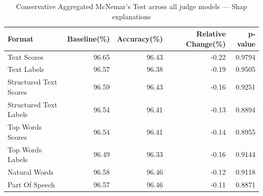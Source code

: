 \begin{table}[htbp]
\centering
\small
\caption{Conservative Aggregated McNemar's Test across all judge models --- Shap explanations}
\label{tab:conservative-aggregated-shap-all-models}
\begin{tabular}{lrrrr}
\toprule
Format & Baseline(\%) & Accuracy(\%) & Relative Change(\%) & p-value \\
\midrule
Text Scores & 96.65 & 96.43 & -0.22 & 0.9794 \\
Text Labels & 96.57 & 96.38 & -0.19 & 0.9505 \\
Structured Text Scores & 96.59 & 96.43 & -0.16 & 0.9251 \\
Structured Text Labels & 96.54 & 96.41 & -0.13 & 0.8894 \\
Top Words Scores & 96.54 & 96.41 & -0.14 & 0.8955 \\
Top Words Labels & 96.49 & 96.33 & -0.16 & 0.9144 \\
Natural Words & 96.58 & 96.46 & -0.12 & 0.9118 \\
Part Of Speech & 96.57 & 96.46 & -0.11 & 0.8871 \\
\bottomrule
\end{tabular}
\end{table}